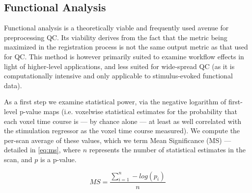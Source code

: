 \subsection{Functional Analysis}

Functional analysis is a theoretically viable and frequently used avenue for preprocessing QC.
Its viability derives from the fact that the metric being maximized in the registration process is not the same output metric as that used for QC.
This method is however primarily suited to examine workflow effects in light of higher-level applications, and less suited for wide-spread QC (as it is computationally intensive and only applicable to stimulus-evoked functional data).

As a first step we examine statistical power, via the negative logarithm of first-level p-value maps (i.e. voxelwise statistical estimates for the probability that each voxel time course is --- by chance alone --- at least as well correlated with the stimulation regressor as the voxel time course measured).
We compute the per-scan average of these values, which we term Mean Significance (MS) --- detailed in \cref{eq:ms}, where $n$ represents the number of statistical estimates in the scan, and $p$ is a p-value.

\begin{equation} \label{eq:ms}
        M\!S = \frac{\sum_{i=1}^n -log(p_i)}{n}
\end{equation}

\begin{sansmath}
\end{sansmath}


